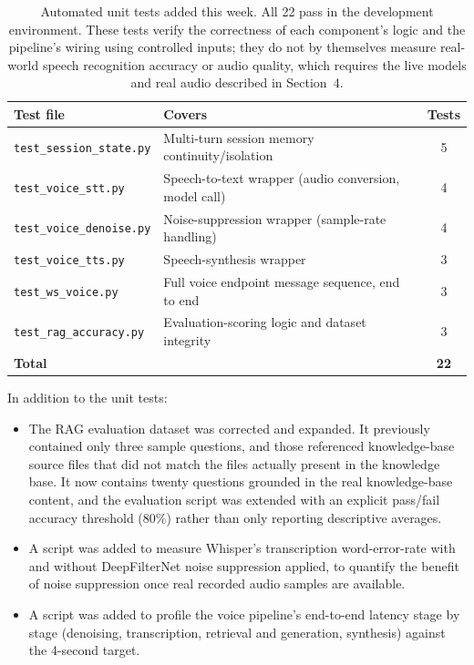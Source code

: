 \documentclass[11pt,a4paper]{article}
\begin{document}
\begin{table}[h]
\centering
\begin{tabular}{@{}llc@{}}
\toprule
\textbf{Test file} & \textbf{Covers} & \textbf{Tests} \\
\midrule
\texttt{test\_session\_state.py} & Multi-turn session memory continuity/isolation & 5 \\
\texttt{test\_voice\_stt.py} & Speech-to-text wrapper (audio conversion, model call) & 4 \\
\texttt{test\_voice\_denoise.py} & Noise-suppression wrapper (sample-rate handling) & 4 \\
\texttt{test\_voice\_tts.py} & Speech-synthesis wrapper & 3 \\
\texttt{test\_ws\_voice.py} & Full voice endpoint message sequence, end to end & 3 \\
\texttt{test\_rag\_accuracy.py} & Evaluation-scoring logic and dataset integrity & 3 \\
\midrule
\textbf{Total} & & \textbf{22} \\
\bottomrule
\end{tabular}
\caption{Automated unit tests added this week. All 22 pass in the development environment. These tests verify the correctness of each component's logic and the pipeline's wiring using controlled inputs; they do not by themselves measure real-world speech recognition accuracy or audio quality, which requires the live models and real audio described in Section~4.}
\end{table}

In addition to the unit tests:

\begin{itemize}
    \item The RAG evaluation dataset was corrected and expanded. It previously contained only three sample questions, and those referenced knowledge-base source files that did not match the files actually present in the knowledge base. It now contains twenty questions grounded in the real knowledge-base content, and the evaluation script was extended with an explicit pass/fail accuracy threshold (80\%) rather than only reporting descriptive averages.
    \item A script was added to measure Whisper's transcription word-error-rate with and without DeepFilterNet noise suppression applied, to quantify the benefit of noise suppression once real recorded audio samples are available.
    \item A script was added to profile the voice pipeline's end-to-end latency stage by stage (denoising, transcription, retrieval and generation, synthesis) against the 4-second target.
\end{itemize}
\end{document}
